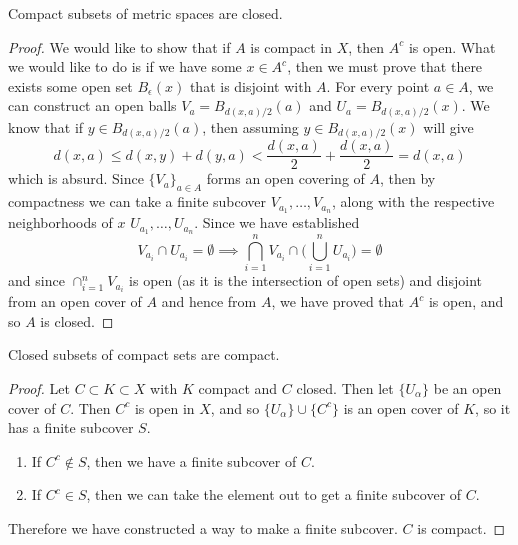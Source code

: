   \begin{theorem}
    Compact subsets of metric spaces are closed. 
  \end{theorem}
  \begin{proof}
    We would like to show that if $A$ is compact in $X$, then $A^c$ is open. What we would like to do is if we have some $x \in A^c$, then we must prove that there exists some open set $B_\epsilon (x)$ that is disjoint with $A$. For every point $a \in A$, we can construct an open balls $V_a = B_{d(x, a)/2} (a)$ and $U_a = B_{d(x, a)/2} (x)$. We know that if $y \in B_{d(x, a)/2}(a)$, then assuming $y \in B_{d(x, a)/2} (x)$ will give
    \begin{equation}
      d(x, a) \leq d(x, y) + d(y, a) < \frac{d(x, a)}{2} + \frac{d(x, a)}{2} = d(x, a)
    \end{equation}
    which is absurd. 
    Since $\{V_a\}_{a \in A}$ forms an open covering of $A$, then by compactness we can take a finite subcover $V_{a_1}, \ldots, V_{a_n}$, along with the respective neighborhoods of $x$ $U_{a_1}, \ldots, U_{a_n}$. Since we have established 
    \begin{equation}
      V_{a_i} \cap U_{a_i} = \emptyset \implies \bigcap_{i=1}^n V_{a_i} \cap \bigg( \bigcup_{i=1}^n U_{a_i} \bigg) = \emptyset
    \end{equation}
    and since $\cap_{i=1}^n V_{a_i}$ is open (as it is the intersection of open sets) and disjoint from an open cover of $A$ and hence from $A$, we have proved that $A^c$ is open, and so $A$ is closed. 
  \end{proof}

  \begin{theorem}
    Closed subsets of compact sets are compact. 
  \end{theorem}
  \begin{proof}
    Let $C \subset K \subset X$ with $K$ compact and $C$ closed. Then let $\{U_\alpha\}$ be an open cover of $C$. Then $C^c$ is open in $X$, and so $\{U_\alpha\} \cup \{C^c\}$ is an open cover of $K$, so it has a finite subcover $S$. 
    \begin{enumerate}
      \item If $C^c \not\in S$, then we have a finite subcover of $C$. 
      \item If $C^c \in S$, then we can take the element out to get a finite subcover of $C$.  
    \end{enumerate}
    Therefore we have constructed a way to make a finite subcover. $C$ is compact. 
  \end{proof}


